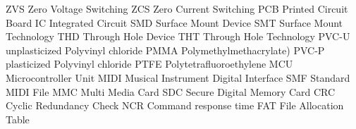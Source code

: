    {ZVS}    {Zero Voltage Switching}
   {ZCS}    {Zero Current Switching}
   {PCB}    {Printed Circuit Board}
    {IC}     {Integrated Circuit}
   {SMD}    {Surface Mount Device}
   {SMT}    {Surface Mount Technology}
   {THD}    {Through Hole Device}
   {THT}    {Through Hole Technology}
  {PVC-U}  {unplasticized Polyvinyl chloride}
  {PMMA}   {Polymethylmethacrylate)}
  {PVC-P}  {plasticized Polyvinyl chloride}
  {PTFE}   {Polytetrafluoroethylene}
   {MCU}    {Microcontroller Unit}
  {MIDI}   {Musical Instrument Digital Interface}
   {SMF}    {Standard MIDI File}
   {MMC}    {Multi Media Card}
   {SDC}    {Secure Digital Memory Card}
   {CRC}    {Cyclic Redundancy Check}
   {NCR}    {Command response time}
   {FAT}    {File Allocation Table}